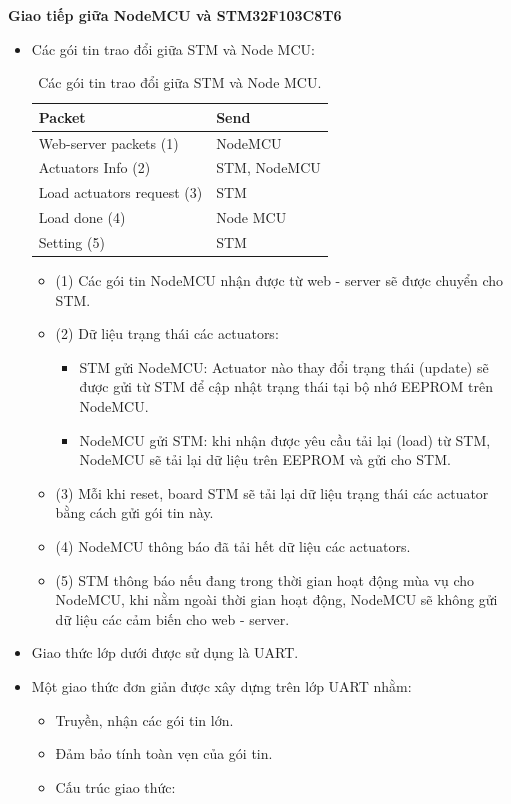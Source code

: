 \documentclass[a4paper,12pt,oneside]{article}
\begin{document}
\noindent	\textbf{Giao tiếp giữa NodeMCU và STM32F103C8T6}
	\begin{itemize}
	\item Các gói tin trao đổi giữa STM và Node MCU:
		\begin{table}[H]
		\centering
		\begin{tabular}{|l|l|}
		\hline
		Packet & Send\\
		\hline
		Web-server packets (1) & NodeMCU\\
		\hline
		Actuators Info (2) & STM, NodeMCU\\
		\hline
		Load actuators request (3) & STM\\
		\hline
		Load done (4) & Node MCU\\
		\hline
		Setting (5) & STM\\
		\hline
		\end{tabular}
		\caption{Các gói tin trao đổi giữa STM và Node MCU.}
		\end{table}
		
		\begin{itemize}
			\item (1) Các gói tin NodeMCU nhận được từ web - server sẽ được chuyển cho STM.
			\item (2) Dữ liệu trạng thái các actuators: 
			\begin{itemize}
				\item STM gửi NodeMCU: Actuator nào thay đổi trạng thái (update) sẽ được gửi từ STM để cập nhật trạng thái tại bộ nhớ EEPROM trên NodeMCU.
				\item NodeMCU gửi STM: khi nhận được yêu cầu tải lại (load) từ STM, NodeMCU sẽ tải lại dữ liệu trên EEPROM và gửi cho STM.
			\end{itemize}
			
			\item (3) Mỗi khi reset, board STM sẽ tải lại dữ liệu trạng thái các actuator bằng cách gửi gói tin này.
			\item (4) NodeMCU thông báo đã tải hết dữ liệu các actuators.
			\item (5) STM thông báo nếu đang trong thời gian hoạt động mùa vụ cho NodeMCU, khi nằm ngoài thời gian hoạt động, NodeMCU sẽ không gửi dữ liệu các cảm biến cho web - server.
		\end{itemize}
	
	\item Giao thức lớp dưới được sử dụng là UART.
	\item Một giao thức đơn giản được xây dựng trên lớp UART nhằm:
		\begin{itemize}
		\item	Truyền, nhận các gói tin lớn.
		\item	Đảm bảo tính toàn vẹn của gói tin.
		\item Cấu trúc giao thức:
			

\end{itemize}
\end{itemize}
\end{document}
